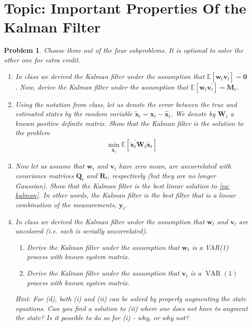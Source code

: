 \documentclass[11pt]{article}
\theoremstyle{plain} %
\newtheorem{problem}[theorem]{Problem}
\theoremstyle{remark}
\begin{document}
\section{Topic: Important Properties Of the Kalman Filter}
\begin{problem}
Choose three out of the four subproblems. It is optional to solve the other one for extra credit.
\begin{enumerate}[label=(\alph*)]
  \item In class we derived the Kalman filter under the assumption that $\mathbb{E}\left[\mathbf{w}_t \mathbf{v}_t^{\prime}\right]=\mathbf{0}$. Now, derive the Kalman filter under the assumption that $\mathbb{E}\left[\mathbf{w}_t \mathbf{v}_t^{\prime}\right]=\mathbf{M}_t$.
  \item Using the notation from class, let us denote the error between the true and estimated states by the random variable $\tilde{\mathbf{x}}_t=\mathbf{x}_t-\hat{\mathbf{x}}_t$. We denote by $\mathbf{W}_t$ a known positive definite matrix. Show that the Kalman filter is the solution to the problem
        \begin{align}
          \min _{\hat{\mathbf{x}}_t} \mathbb{E}\left[\tilde{\mathbf{x}}_t^{\prime} \mathbf{W}_t \tilde{\mathbf{x}}_t\right]\label{eq: kalman}
        \end{align}
  \item Now let us assume that $\mathbf{w}_t$ and $\mathbf{v}_t$ have zero mean, are uncorrelated with covariance matrices $\mathbf{Q}_t$ and $\mathbf{R}_t$, respectively (but they are no longer Gaussian). Show that the Kalman filter is the best linear solution to \cref{eq: kalman}. In other words, the Kalman filter is the best filter that is a linear combination of the measurements, $\mathbf{y}_t$.
  \item In class we derived the Kalman filter under the assumption that $\mathbf{w}_t$ and $\mathbf{v}_t$ are uncolored (i.e. each is serially uncorrelated).
        \begin{enumerate}[label=(\roman*)]
          \item Derive the Kalman filter under the assumption that $\mathbf{w}_t$ is a VAR(1) process with known system matrix.
          \item Derive the Kalman filter under the assumption that $\mathbf{v}_t$ is a $\operatorname{VAR}(1)$ process with known system matrix.
        \end{enumerate}
        Hint: For (d), both (i) and (ii) can be solved by properly augmenting the state equations. Can you find a solution to (ii) where one does not have to augment the state? Is it possible to do so for (i) - why, or why not?
\end{enumerate}

\end{problem}
\end{document}
